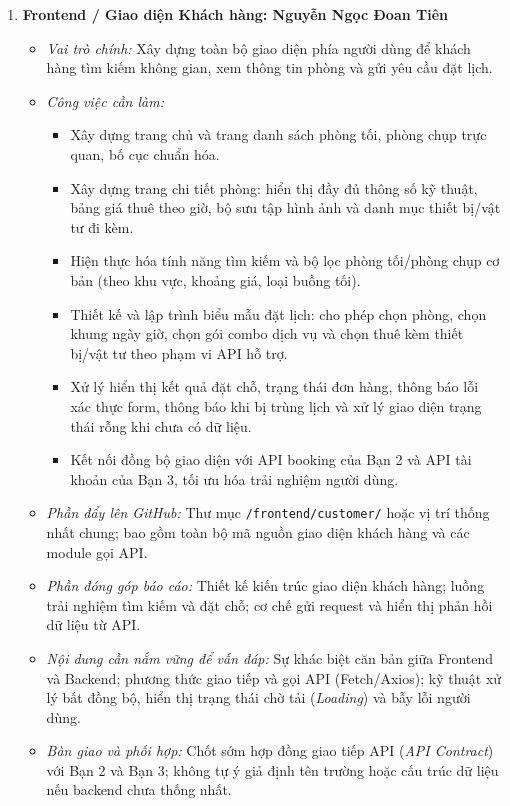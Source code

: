 \begin{enumerate}[leftmargin=1.5em]
    \item \textbf{Frontend / Giao diện Khách hàng: Nguyễn Ngọc Đoan Tiên}
    \begin{itemize}[leftmargin=1.2em]
        \item \textit{Vai trò chính:} Xây dựng toàn bộ giao diện phía người dùng để khách hàng tìm kiếm không gian, xem thông tin phòng và gửi yêu cầu đặt lịch.
        \item \textit{Công việc cần làm:}
        \begin{itemize}[label={--}]
            \item Xây dựng trang chủ và trang danh sách phòng tối, phòng chụp trực quan, bố cục chuẩn hóa.
            \item Xây dựng trang chi tiết phòng: hiển thị đầy đủ thông số kỹ thuật, bảng giá thuê theo giờ, bộ sưu tập hình ảnh và danh mục thiết bị/vật tư đi kèm.
            \item Hiện thực hóa tính năng tìm kiếm và bộ lọc phòng tối/phòng chụp cơ bản (theo khu vực, khoảng giá, loại buồng tối).
            \item Thiết kế và lập trình biểu mẫu đặt lịch: cho phép chọn phòng, chọn khung ngày giờ, chọn gói combo dịch vụ và chọn thuê kèm thiết bị/vật tư theo phạm vi API hỗ trợ.
            \item Xử lý hiển thị kết quả đặt chỗ, trạng thái đơn hàng, thông báo lỗi xác thực form, thông báo khi bị trùng lịch và xử lý giao diện trạng thái rỗng khi chưa có dữ liệu.
            \item Kết nối đồng bộ giao diện với API booking của Bạn 2 và API tài khoản của Bạn 3, tối ưu hóa trải nghiệm người dùng.
        \end{itemize}
        \item \textit{Phần đẩy lên GitHub:} Thư mục \texttt{/frontend/customer/} hoặc vị trí thống nhất chung; bao gồm toàn bộ mã nguồn giao diện khách hàng và các module gọi API.
        \item \textit{Phần đóng góp báo cáo:} Thiết kế kiến trúc giao diện khách hàng; luồng trải nghiệm tìm kiếm và đặt chỗ; cơ chế gửi request và hiển thị phản hồi dữ liệu từ API.
        \item \textit{Nội dung cần nắm vững để vấn đáp:} Sự khác biệt căn bản giữa Frontend và Backend; phương thức giao tiếp và gọi API (Fetch/Axios); kỹ thuật xử lý bất đồng bộ, hiển thị trạng thái chờ tải (\textit{Loading}) và bẫy lỗi người dùng.
        \item \textit{Bàn giao và phối hợp:} Chốt sớm hợp đồng giao tiếp API (\textit{API Contract}) với Bạn 2 và Bạn 3; không tự ý giả định tên trường hoặc cấu trúc dữ liệu nếu backend chưa thống nhất.
    \end{itemize}


\end{enumerate}

